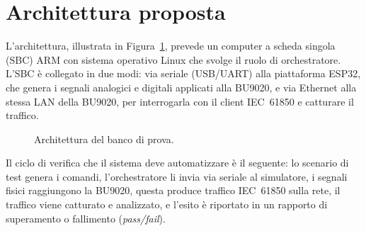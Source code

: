 \documentclass[11pt,a4paper,italian,oneside,openany]{book}
\begin{document}
\section{Architettura proposta}
L'architettura, illustrata in Figura~\ref{fig:architettura}, prevede un computer a scheda singola (SBC) ARM con sistema operativo Linux che svolge il ruolo di orchestratore. L'SBC è collegato in due modi: via seriale (USB/UART) alla piattaforma ESP32, che genera i segnali analogici e digitali applicati alla BU9020, e via Ethernet alla stessa LAN della BU9020, per interrogarla con il client IEC~61850 e catturare il traffico.

\begin{figure}[htbp]
\centering
{}
\caption{Architettura del banco di prova.}
\label{fig:architettura}
\end{figure}

Il ciclo di verifica che il sistema deve automatizzare è il seguente: lo scenario di test genera i comandi, l'orchestratore li invia via seriale al simulatore, i segnali fisici raggiungono la BU9020, questa produce traffico IEC~61850 sulla rete, il traffico viene catturato e analizzato, e l'esito è riportato in un rapporto di superamento o fallimento (\textit{pass/fail}).
\end{document}
